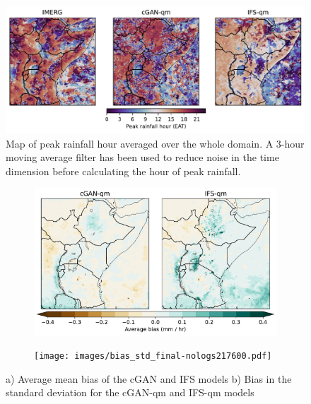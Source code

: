 \documentclass{article}
\begin{document}
\begin{figure}[t]
\centering
\begin{subcaptionblock}{\textwidth}
        \centering
        \includegraphics[width=\textwidth]{images/diurnal_cycle_map_All_final-nologs_217600.pdf}
        \caption{}\label{}
    \end{subcaptionblock}%
    \hfill
     \caption{Map of peak rainfall hour averaged over the whole domain. A 3-hour moving average filter has been used to reduce noise in the time dimension before calculating the hour of peak rainfall.}
     \label{fig:peak_hour}
\end{figure}


\begin{figure}[!ht]
    \centering
    \begin{subfigure}{0.8\textwidth}
    \centering
     \includegraphics[width=\textwidth]{images/bias_final-nologs217600.pdf}
     \caption{}
     \end{subfigure}
     \begin{subfigure}{0.8\textwidth}
    \centering
     \texttt{[image: images/bias\_std\_final-nologs217600.pdf]}
     \caption{}
     \end{subfigure}
    
     \caption{a) Average mean bias of the cGAN and IFS models b) Bias in the standard deviation for the cGAN-qm and IFS-qm models }
     \label{fig:bias}
\end{figure}
\end{document}
